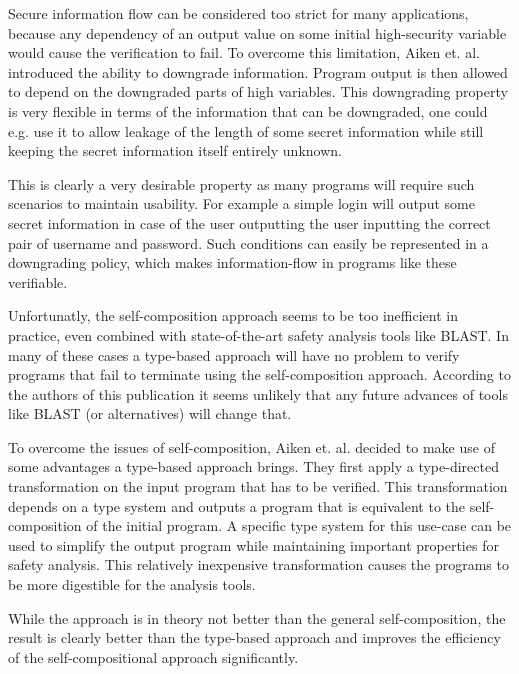 \documentclass[a4paper,UKenglish]{lipics-v2018}
\begin{document}
Secure information flow can be considered too strict for many applications, because any dependency of an output value on some initial high-security variable would cause the verification to fail. To overcome this limitation, Aiken et. al. introduced the ability to downgrade information. Program output is then allowed to depend on the downgraded parts of high variables. This downgrading property is very flexible in terms of the information that can be downgraded, one could e.g. use it to allow leakage of the length of some secret information while still keeping the secret information itself entirely unknown.\cite{secure_information_flow_safety}

This is clearly a very desirable property as many programs will require such scenarios to maintain usability. For example a simple login will output some secret information in case of the user outputting the user inputting the correct pair of username and password. Such conditions can easily be represented in a downgrading policy, which makes information-flow in programs like these verifiable.\cite{secure_information_flow_safety}

Unfortunatly, the self-composition approach seems to be too inefficient in practice, even combined with state-of-the-art safety analysis tools like BLAST. In many of these cases a type-based approach will have no problem to verify programs that fail to terminate using the self-composition approach. According to the authors of this publication it seems unlikely that any future advances of tools like BLAST (or alternatives) will change that.\cite{secure_information_flow_safety}

To overcome the issues of self-composition, Aiken et. al. decided to make use of some advantages a type-based approach brings. They first apply a type-directed transformation on the input program that has to be verified. This transformation depends on a type system and outputs a program that is equivalent to the self-composition of the initial program. A specific type system for this use-case can be used to simplify the output program while maintaining important properties for safety analysis. This relatively inexpensive transformation causes the programs to be more digestible for the analysis tools. 
\cite{secure_information_flow_safety}

While the approach is in theory not better than the general self-composition, the result is clearly better than the type-based approach and improves the efficiency of the self-compositional approach significantly.
\cite{secure_information_flow_safety}
\end{document}
